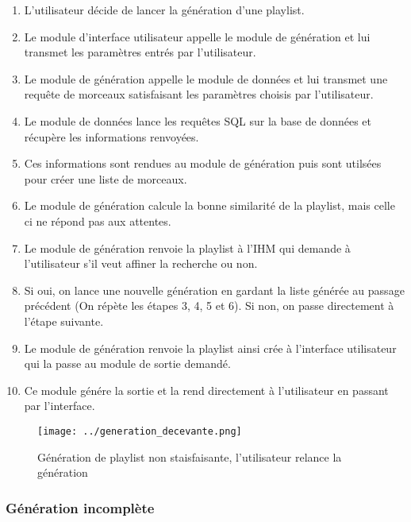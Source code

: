 \begin{enumerate}
\item L'utilisateur décide de lancer la génération d'une playlist.
\item Le module d'interface utilisateur appelle le module de génération et 
lui transmet les paramètres entrés par l'utilisateur.
\item Le module de génération appelle le module de données et lui transmet 
une requête de morceaux satisfaisant les paramètres choisis par l'utilisateur.
\item Le module de données lance les requêtes SQL sur la base de données et
récupère les informations renvoyées.
\item Ces informations sont rendues au module de génération puis sont 
utilsées pour créer une liste de morceaux.
\item Le module de génération calcule la bonne similarité de la playlist, 
mais celle ci ne répond pas aux attentes.
\item Le module de génération renvoie la playlist à l'IHM qui demande à 
l'utilisateur s'il veut affiner la recherche ou non.
\item Si oui, on lance une nouvelle génération en gardant la liste générée 
au passage précédent (On répète les étapes 3, 4, 5 et 6). Si non, on passe 
directement à l'étape suivante.
\item Le module de génération renvoie la playlist ainsi crée à l'interface 
utilisateur qui la passe au module de sortie demandé.
\item Ce module génére la sortie et la rend directement à l'utilisateur en 
passant par l'interface.
\end{enumerate}

\begin{figure}[!h]
\texttt{[image: ../generation\_decevante.png]}
\caption{Génération de playlist non staisfaisante, l'utilisateur relance la génération}
\end{figure}
 

\subsubsection{Génération incomplète}

